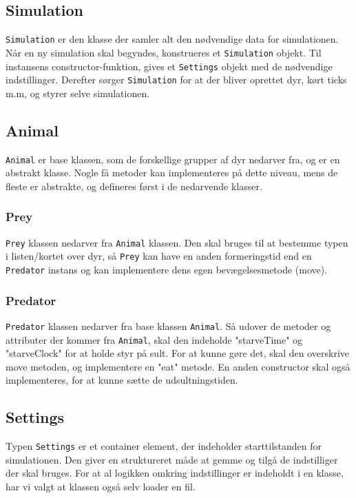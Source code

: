 \documentclass[a4paper]{article}
\begin{document}
    \subsection*{Simulation}
      \texttt{Simulation} er den klasse der samler alt den nødvendige data for simulationen.
      Når en ny simulation skal begyndes, konstrueres et \texttt{Simulation} objekt.
      Til instansens constructor-funktion, gives et \texttt{Settings} objekt med de nødvendige indstillinger.
      Derefter sørger \texttt{Simulation} for at der bliver oprettet dyr,
      kørt ticks m.m, og styrer selve simulationen.

    \subsection*{Animal}
      \texttt{Animal} er base klassen, som de forskellige grupper af dyr nedarver fra, og er en abstrakt klasse.
      Nogle få metoder kan implementeres på dette niveau, mens de fleste er abstrakte, og defineres først i de nedarvende klasser.

      \subsubsection*{Prey}
        \texttt{Prey} klassen nedarver fra \texttt{Animal} klassen.
        Den skal bruges til at bestemme typen i listen/kortet over dyr,
        så \texttt{Prey} kan have en anden formeringstid end en \texttt{Predator} instans og kan implementere dens egen bevægelsesmetode (move).

      \subsubsection*{Predator}
        \texttt{Predator} klassen nedarver fra base klassen \texttt{Animal}.
        Så udover de metoder og attributer der kommer fra \texttt{Animal}, skal 
        den indeholde "starveTime" og "starveClock" for at holde styr på sult. 
        For at kunne gøre det, skal den overskrive move metoden,
        og implementere en "eat" metode. En anden constructor skal også implementeres, for at kunne sætte de udsultningstiden.

    \subsection*{Settings} \label{ssec:designSettings}
      Typen \texttt{Settings} er et container element, 
      der indeholder starttilstanden for simulationen.
      Den giver en struktureret måde at gemme og tilgå de indstilliger der skal bruges.
      For at al logikken omkring indstillinger er indeholdt i en klasse,
      har vi valgt at klassen også selv loader en fil.
\end{document}
